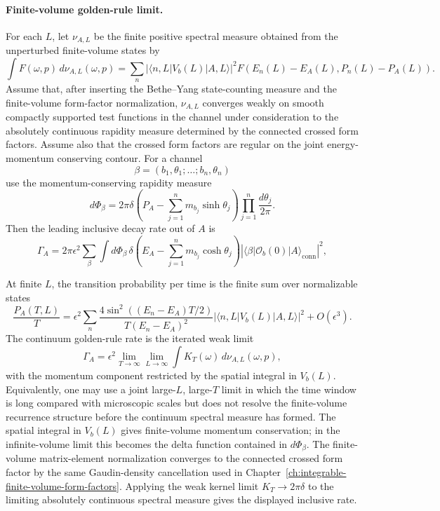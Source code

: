 \paragraph{Finite-volume golden-rule limit.}
For each \(L\), let \(\nu_{A,L}\) be the finite positive spectral measure
obtained from the unperturbed finite-volume states by
\[
  \int F(\omega,p)\,d\nu_{A,L}(\omega,p)
  =
  \sum_n
  |\langle n,L|V_b(L)|A,L\rangle|^2
  F(E_n(L)-E_A(L),P_n(L)-P_A(L)).
\]
Assume that, after inserting the Bethe--Yang state-counting measure and the
finite-volume form-factor normalization, \(\nu_{A,L}\) converges weakly on
smooth compactly supported test functions in the channel under consideration
to the absolutely continuous rapidity measure determined by the connected
crossed form factors.  Assume also that the crossed form factors are regular
on the joint energy-momentum conserving contour.  For a channel
\[
  \beta=(b_1,\theta_1;\ldots;b_n,\theta_n)
\]
use the momentum-conserving rapidity measure
\[
  d\Phi_\beta
  =
  2\pi\delta
  \!\left(P_A-\sum_{j=1}^n m_{b_j}\sinh\theta_j\right)
  \prod_{j=1}^n\frac{d\theta_j}{2\pi}.
\]
Then the leading inclusive decay rate out of \(A\) is
\[
  \Gamma_A
  =
  2\pi\epsilon^2
  \sum_\beta
  \int d\Phi_\beta\,
  \delta\!\left(E_A-\sum_{j=1}^n m_{b_j}\cosh\theta_j\right)
  \left|
    \langle\beta|\mathcal O_b(0)|A\rangle_{\mathrm{conn}}
  \right|^2 ,
\]

At finite \(L\), the transition probability per time is the finite sum over
normalizable states
\[
  \frac{P_A(T,L)}{T}
  =
  \epsilon^2
  \sum_n
  \frac{4\sin^2((E_n-E_A)T/2)}{T(E_n-E_A)^2}
  |\langle n,L|V_b(L)|A,L\rangle|^2
  +O(\epsilon^3).
\]
The continuum golden-rule rate is the iterated weak limit
\[
  \Gamma_A
  =
  \epsilon^2\lim_{T\to\infty}\lim_{L\to\infty}
  \int K_T(\omega)\,d\nu_{A,L}(\omega,p),
\]
with the momentum component restricted by the spatial integral in
\(V_b(L)\).  Equivalently, one may use a joint large-\(L\), large-\(T\) limit
in which the time window is long compared with microscopic scales but does not
resolve the finite-volume recurrence structure before the continuum spectral
measure has formed.  The spatial integral in \(V_b(L)\) gives finite-volume
momentum conservation; in the infinite-volume limit this becomes the delta
function contained in \(d\Phi_\beta\).  The finite-volume matrix-element
normalization converges to the connected crossed form factor by the same
Gaudin-density cancellation used in
Chapter~\ref{ch:integrable-finite-volume-form-factors}.  Applying the weak
kernel limit \(K_T\to2\pi\delta\) to the limiting absolutely continuous
spectral measure gives the displayed inclusive rate.

